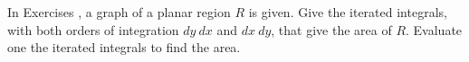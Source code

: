 {\noindent In Exercises}
{, a graph of a planar region $R$ is given. Give the iterated integrals, with both orders of integration $dy\ dx$ and $dx\ dy$, that give the area of $R$. Evaluate one the iterated integrals to find the area.}
